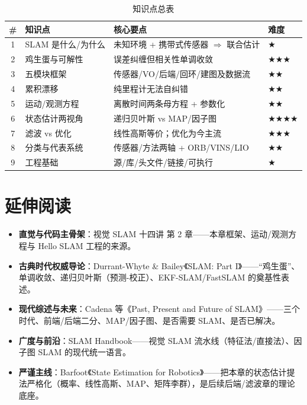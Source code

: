 \begin{table}[H]\centering\small
\caption{知识点总表}
\begin{tabular}{clll}
\toprule
\# & 知识点 & 核心要点 & 难度 \\
\midrule
1 & SLAM 是什么/为什么 & 未知环境 + 携带式传感器 $\Rightarrow$ 联合估计 & $\bigstar$ \\
2 & 鸡生蛋与可解性 & 误差纠缠但相关性单调收敛 & $\bigstar\bigstar\bigstar$ \\
3 & 五模块框架 & 传感器/VO/后端/回环/建图及数据流 & $\bigstar\bigstar$ \\
4 & 累积漂移 & 纯里程计无法自纠错 & $\bigstar\bigstar$ \\
5 & 运动/观测方程 & 离散时间两条母方程 + 参数化 & $\bigstar\bigstar$ \\
6 & 状态估计两视角 & 递归贝叶斯 vs MAP/因子图 & $\bigstar\bigstar\bigstar\bigstar$ \\
7 & 滤波 vs 优化 & 线性高斯等价；优化为今主流 & $\bigstar\bigstar\bigstar$ \\
8 & 分类与代表系统 & 传感器/方法两轴 + ORB/VINS/LIO & $\bigstar\bigstar$ \\
9 & 工程基础 & 源/库/头文件/链接/可执行 & $\bigstar$ \\
\bottomrule
\end{tabular}
\end{table}

\section*{延伸阅读}
\begin{itemize}
  \item \textbf{直觉与代码主骨架}：视觉 SLAM 十四讲\cite{gaoxiang2019slam14} 第 2 章——本章框架、运动/观测方程与 Hello SLAM 工程的来源。
  \item \textbf{古典时代权威导论}：Durrant-Whyte \& Bailey\cite{durrantwhyte2006slam}《SLAM: Part I》——“鸡生蛋”、单调收敛、递归贝叶斯（预测-校正）、EKF-SLAM/FastSLAM 的奠基性表述。
  \item \textbf{现代综述与未来}：Cadena 等\cite{cadena2016past}《Past, Present and Future of SLAM》——三个时代、前端/后端二分、MAP/因子图、是否需要 SLAM、是否已解决。
  \item \textbf{广度与前沿}：SLAM Handbook\cite{carlone2026handbook}——视觉 SLAM 流水线（特征法/直接法）、因子图 SLAM 的现代统一语言。
  \item \textbf{严谨主线}：Barfoot《State Estimation for Robotics》\cite{barfoot2024state}——把本章的状态估计提法严格化（概率、线性高斯、MAP、矩阵李群），是后续后端/滤波章的理论底座。
\end{itemize}

